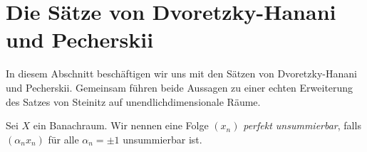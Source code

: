 \section{Die Sätze von Dvoretzky-Hanani und Pecherskii}\label{sc:hanani_pecherskii}
In diesem Abschnitt beschäftigen wir uns mit den Sätzen von Dvoretzky-Hanani\cite{Dvoretzky1947} und Pecherskii\cite{Pecherski1989}.
Gemeinsam führen beide Aussagen zu einer echten Erweiterung des Satzes von Steinitz auf unendlichdimensionale Räume.


\begin{df}
	Sei $ X $ ein Banachraum.
	Wir nennen eine Folge $ (x_n) $ \textit{perfekt unsummierbar}, falls
	$ (\alpha_n x_n) $ für alle $ \alpha_n = \pm 1 $ unsummierbar ist.
\end{df}

